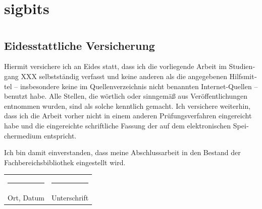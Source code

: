 \documentclass[
	12pt,
	a4paper,
	BCOR10mm,
	DIV14,
	headsepline,
]{scrreprt}
\begin{document}
\chapter{sigbits}
\label{sigbits}

\listoffigures

\lstlistoflistings

\listoftables

\chapter*{}

\thispagestyle{empty}

\section*{Eidesstattliche Versicherung}

\begin{otherlanguage}{ngerman}
Hiermit versichere ich an Eides statt, dass ich die vorliegende Arbeit im Studiengang XXX selbstständig verfasst und keine anderen als die angegebenen Hilfsmittel -- insbesondere keine im Quellenverzeichnis nicht benannten Internet-Quellen -- benutzt habe.
Alle Stellen, die wörtlich oder sinngemäß aus Veröffentlichungen entnommen wurden, sind als solche kenntlich gemacht.
Ich versichere weiterhin, dass ich die Arbeit vorher nicht in einem anderen Prüfungsverfahren eingereicht habe und die eingereichte schriftliche Fassung der auf dem elektronischen Speichermedium entspricht.

\bigskip

\noindent
Ich bin damit einverstanden, dass meine Abschlussarbeit in den Bestand der Fachbereichsbibliothek eingestellt wird.
\end{otherlanguage}

\bigskip
\bigskip
\bigskip

\begin{center}
\begin{tabular}{ll}
	\rule{0.35\textwidth}{0.4pt} & \rule{0.55\textwidth}{0.4pt} \\
	Ort, Datum & Unterschrift
\end{tabular}
\end{center}
\end{document}
